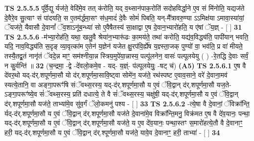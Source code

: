 \documentclass[17pt]{extarticle}
\begin{document}
                  \newline
                                \textbf{ TS 2.5.5.5} \newline
                  पू᳚र्वे॒द्यु र्यज॑ते॒ वेदि॑मे॒व तत् क॑रोति॒ यद् व॒थ्सान॑पाक॒रोति॑ सदोहविर्द्धा॒ने ए॒व सं मि॑नोति॒ यद्यज॑ते दे॒वैरे॒व सु॒त्याꣳ सं पा॑दयति॒ स ए॒तम॑र्द्धमा॒सꣳ स॑ध॒मादं॑ दे॒वैः सोमं॑ पिबति॒ यन्-मै᳚त्रावरु॒ण्या ऽऽमिक्ष॑या ऽमावा॒स्या॑यां॒ ॅयज॑ते॒ यैवासौ दे॒वानां᳚ ॅव॒शाऽनू॑ब॒न्ध्या॑ सो ए॒वैषैतस्य॑ सा॒क्षाद्वा ए॒ष दे॒वान॒भ्यारो॑हति॒ य ए॑षां ॅय॒ज्ञ् - [  ] \textbf{  31} \newline
                  \newline
                                \textbf{ TS 2.5.5.6} \newline
                  -म॑भ्या॒रोह॑ति॒ यथा॒ खलु॒वै श्रेया॑न॒भ्यारू॑ढः का॒मय॑ते॒ तथा॑ करोति॒ यद्य॑व॒विद्ध्य॑ति॒ पापी॑यान् भवति॒ यदि॒ नाव॒विद्ध्य॑ति स॒दृङ् व्या॒वृत्का॑म ए॒तेन॑ य॒ज्ञेन॑ यजेत क्षु॒रप॑वि॒र्ह्ये॑ष य॒ज्ञ्स्ता॒जक् पुण्यो॑ वा॒ भव॑ति॒ प्र वा॑ मीयते॒ तस्यै॒तद्व्र॒तं नानृ॑तं ॅवदे॒न्न माꣳ॒॒ सम॑श्नीया॒न्न स्त्रिय॒मुपे॑या॒न्नास्य॒ पल्पू॑लनेन॒ वासः॑ पल्पूलयेयु ( ) -रे॒तद्धि दे॒वाः सर्वं॒ न कु॒र्वन्ति॑ ॥ \textbf{  32} \newline
                  \newline
                      (च॒न्द्रमा॒ -द्वे -दे॑वलो॒कमे॒व - यद्- य॒ज्ञ्ं- प॑ल्पूलयेयुः॒ -षट् च॑)  \textbf{(A5)} \newline \newline
                                        \textbf{ TS 2.5.6.1} \newline
                  ए॒ष वै दे॑वर॒थो यद्-द॑र्.शपूर्णमा॒सौ यो द॑र्.शपूर्णमा॒सावि॒ष्ट्वा सोमे॑न॒ यज॑ते॒ रथ॑स्पष्ट ए॒वाव॒साने॒ वरे॑ दे॒वाना॒मव॑ स्यत्ये॒तानि॒ वा अङ्गा॒परूꣳ॑षि संॅवथ्स॒रस्य॒ यद्-द॑र्.शपूर्णमा॒सौ य ए॒वं ॅवि॒द्वान् द॑र्.शपूर्णमा॒सौ यज॒ते-ऽङ्गा॒परूꣳ॑ष्ये॒व सं॑ॅवथ्स॒रस्य॒ प्रति॑ दधात्ये॒ ते वै सं॑ॅवथ्स॒रस्य॒ चक्षु॑षी॒ यद्-द॑र्.शपूर्णमा॒सौ य ए॒वं ॅवि॒द्वान् द॑र्.शपूर्णमा॒सौ यज॑ते॒ ताभ्या॑मे॒व सु॑व॒र्गं ॅलो॒कमनु॑ पश्य - [  ] \textbf{  33} \newline
                  \newline
                                \textbf{ TS 2.5.6.2} \newline
                  -त्ये॒षा वै दे॒वानां॒ ॅविक्रा᳚न्ति॒ र्यद्-द॑र्.शपूर्णमा॒सौ य ए॒वं ॅवि॒द्वान् द॑र्.शपूर्णमा॒सौ यज॑ते दे॒वाना॑मे॒व विक्रा᳚न्ति॒मनु॒ विक्र॑मत ए॒ष वै दे॑व॒यानः॒ पन्था॒ यद्-द॑र्.शपूर्णमा॒सौ य ए॒वं ॅवि॒द्वान् द॑र्.शपूर्णमा॒सौ यज॑ते॒ य ए॒व दे॑व॒यानः॒ पन्था॒स्तꣳ स॒मारो॑हत्ये॒तौ वै दे॒वानाꣳ॒॒ हरी॒ यद्-द॑र्.शपूर्णमा॒सौ य ए॒वं ॅवि॒द्वान् द॑र्.श्पूर्णमा॒सौ यज॑ते॒ यावे॒व दे॒वानाꣳ॒॒ हरी॒ ताभ्या॑ - [  ] \textbf{  34} \newline
\end{document}
